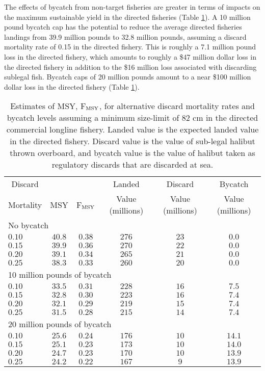 \documentclass[12pt,leqno]{article}
\newcommand{\fmsy}{F$_{\textnormal{MSY}}$}
\begin{document}
The effects of bycatch from non-target fisheries are greater in terms of impacts on the maximum sustainable yield in the directed fisheries (Table \ref{tab:landedValue}).  A 10 million pound bycatch cap has the potential to reduce the average directed fisheries landings from 39.9 million pounds to 32.8 million pounds, assuming a discard mortality rate of 0.15 in the directed fishery.  This is roughly a 7.1 million pound loss in the directed fishery, which amounts to roughly a \$47 million dollar loss in the directed fishery in addition to the \$16 million loss associated with discarding sublegal fish.  Bycatch caps of 20 million pounds amount to a near \$100 million dollar loss in the directed fishery (Table \ref{tab:landedValue}).

\begin{table}[!tbp]
\caption{Estimates of MSY, \fmsy, for alternative discard mortality rates and bycatch levels assuming a minimum size-limit of 82 cm in the directed commercial longline fishery. Landed value is the expected landed value in the directed fishery. Discard value is the value of sub-legal halibut thrown overboard, and bycatch value is the value of halibut taken as regulatory discards that are discarded at sea.}\label{tab:landedValue}
\begin{center}
\begin{tabular}{lccccc}
\hline\hline
\multicolumn{1}{c}{Discard}&
\multicolumn{1}{c}{}&
\multicolumn{1}{c}{}&
\multicolumn{1}{c}{Landed}&
\multicolumn{1}{c}{Discard}&
\multicolumn{1}{c}{Bycatch}
\tabularnewline
\multicolumn{1}{c}{Mortality}&
\multicolumn{1}{c}{MSY}&
\multicolumn{1}{c}{\fmsy}&
\multicolumn{1}{c}{Value (millions)}&
\multicolumn{1}{c}{Value (millions)}&
\multicolumn{1}{c}{Value (millions)}
\tabularnewline
\hline
\multicolumn{6}{l}{No bycatch} \tabularnewline
$0.10$ & $40.8$ & $0.38$ & $276$ & $23$ & $ 0.0$\tabularnewline
$0.15$ & $39.9$ & $0.36$ & $270$ & $22$ & $ 0.0$\tabularnewline
$0.20$ & $39.1$ & $0.34$ & $265$ & $21$ & $ 0.0$\tabularnewline
$0.25$ & $38.3$ & $0.33$ & $260$ & $20$ & $ 0.0$\tabularnewline
\hline
\multicolumn{6}{l}{10 million pounds of bycatch} \tabularnewline
$0.10$ & $33.5$ & $0.31$ & $228$ & $16$ & $ 7.5$\tabularnewline
$0.15$ & $32.8$ & $0.30$ & $223$ & $16$ & $ 7.4$\tabularnewline
$0.20$ & $32.1$ & $0.29$ & $219$ & $15$ & $ 7.4$\tabularnewline
$0.25$ & $31.5$ & $0.28$ & $215$ & $14$ & $ 7.4$\tabularnewline
\hline
\multicolumn{6}{l}{20 million pounds of bycatch} \tabularnewline
$0.10$ & $25.6$ & $0.24$ & $176$ & $10$ & $14.1$\tabularnewline
$0.15$ & $25.1$ & $0.23$ & $173$ & $10$ & $14.0$\tabularnewline
$0.20$ & $24.7$ & $0.23$ & $170$ & $10$ & $13.9$\tabularnewline
$0.25$ & $24.2$ & $0.22$ & $167$ & $ 9$ & $13.9$\tabularnewline
\hline
\end{tabular}
\end{center}
\end{table}
\end{document}
